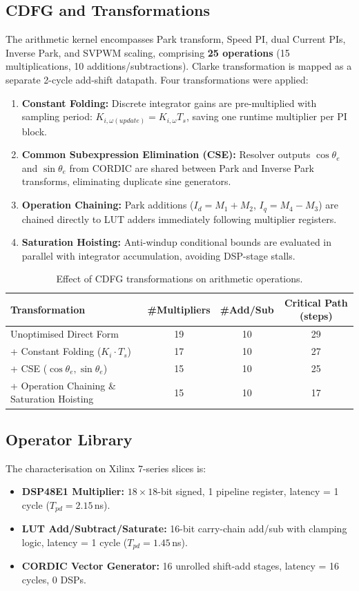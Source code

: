 \documentclass[11pt,a4paper]{article}
\begin{document}
\subsection{CDFG and Transformations}
The arithmetic kernel encompasses Park transform, Speed PI, dual Current PIs, Inverse Park, and SVPWM scaling, comprising \textbf{25 operations} (15 multiplications, 10 additions/subtractions). Clarke transformation is mapped as a separate 2-cycle add-shift datapath. Four transformations were applied:
\begin{enumerate}
  \item \textbf{Constant Folding:} Discrete integrator gains are pre-multiplied with sampling period: $K_{i,\omega(update)} = K_{i,\omega} T_s$, saving one runtime multiplier per PI block.
  \item \textbf{Common Subexpression Elimination (CSE):} Resolver outputs $\cos\theta_e$ and $\sin\theta_e$ from CORDIC are shared between Park and Inverse Park transforms, eliminating duplicate sine generators.
  \item \textbf{Operation Chaining:} Park additions ($I_d = M_1 + M_2$, $I_q = M_4 - M_3$) are chained directly to LUT adders immediately following multiplier registers.
  \item \textbf{Saturation Hoisting:} Anti-windup conditional bounds are evaluated in parallel with integrator accumulation, avoiding DSP-stage stalls.
\end{enumerate}

\begin{table}[H]\centering\small
\caption{Effect of CDFG transformations on arithmetic operations.}\label{tab:transform}
\begin{tabular}{@{}lccc@{}}
\toprule
Transformation & \#Multipliers & \#Add/Sub & Critical Path (steps)\\
\midrule
Unoptimised Direct Form & 19 & 10 & 29\\
+ Constant Folding ($K_i \cdot T_s$) & 17 & 10 & 27\\
+ CSE ($\cos\theta_e, \sin\theta_e$) & 15 & 10 & 25\\
+ Operation Chaining \& Saturation Hoisting & 15 & 10 & 17\\
\bottomrule
\end{tabular}
\end{table}

\subsection{Operator Library}
The characterisation on Xilinx 7-series slices is:
\begin{itemize}
  \item \textbf{DSP48E1 Multiplier:} $18 \times 18$-bit signed, 1 pipeline register, latency = 1 cycle ($T_{pd} = 2.15$\,ns).
  \item \textbf{LUT Add/Subtract/Saturate:} 16-bit carry-chain add/sub with clamping logic, latency = 1 cycle ($T_{pd} = 1.45$\,ns).
  \item \textbf{CORDIC Vector Generator:} 16 unrolled shift-add stages, latency = 16 cycles, 0 DSPs.
\end{itemize}
\end{document}
